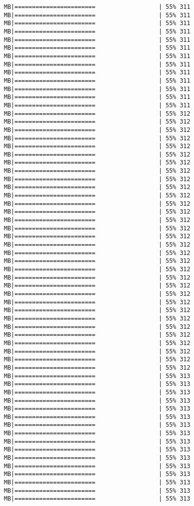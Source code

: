 \documentclass[
]{article}
\begin{document}
\begin{verbatim}
MB|=======================                  | 55% 311 MB|=======================                  | 55% 311 MB|=======================                  | 55% 311 MB|=======================                  | 55% 311 MB|=======================                  | 55% 311 MB|=======================                  | 55% 311 MB|=======================                  | 55% 311 MB|=======================                  | 55% 311 MB|=======================                  | 55% 311 MB|=======================                  | 55% 311 MB|=======================                  | 55% 311 MB|=======================                  | 55% 311 MB|=======================                  | 55% 311 MB|=======================                  | 55% 312 MB|=======================                  | 55% 312 MB|=======================                  | 55% 312 MB|=======================                  | 55% 312 MB|=======================                  | 55% 312 MB|=======================                  | 55% 312 MB|=======================                  | 55% 312 MB|=======================                  | 55% 312 MB|=======================                  | 55% 312 MB|=======================                  | 55% 312 MB|=======================                  | 55% 312 MB|=======================                  | 55% 312 MB|=======================                  | 55% 312 MB|=======================                  | 55% 312 MB|=======================                  | 55% 312 MB|=======================                  | 55% 312 MB|=======================                  | 55% 312 MB|=======================                  | 55% 312 MB|=======================                  | 55% 312 MB|=======================                  | 55% 312 MB|=======================                  | 55% 312 MB|=======================                  | 55% 312 MB|=======================                  | 55% 312 MB|=======================                  | 55% 312 MB|=======================                  | 55% 312 MB|=======================                  | 55% 312 MB|=======================                  | 55% 312 MB|=======================                  | 55% 312 MB|=======================                  | 55% 312 MB|=======================                  | 55% 312 MB|=======================                  | 55% 312 MB|=======================                  | 55% 312 MB|=======================                  | 55% 313 MB|=======================                  | 55% 313 MB|=======================                  | 55% 313 MB|=======================                  | 55% 313 MB|=======================                  | 55% 313 MB|=======================                  | 55% 313 MB|=======================                  | 55% 313 MB|=======================                  | 55% 313 MB|=======================                  | 55% 313 MB|=======================                  | 55% 313 MB|=======================                  | 55% 313 MB|=======================                  | 55% 313 MB|=======================                  | 55% 313 MB|=======================                  | 55% 313 MB|=======================                  | 55% 313 MB|=======================                  | 55% 313 
\end{verbatim}
\end{document}
